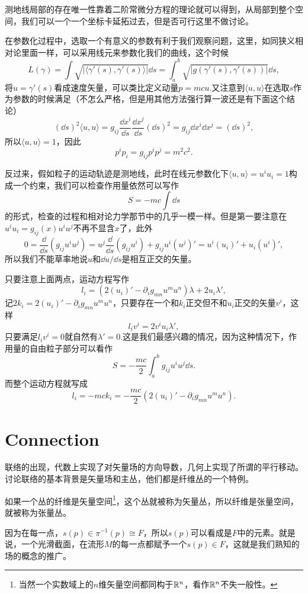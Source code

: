 测地线局部的存在唯一性靠着二阶常微分方程的理论就可以得到，从局部到整个空间，我们可以一个一个坐标卡延拓过去，但是否可行这里不做讨论。

在参数化过程中，选取一个有意义的参数有利于我们观察问题，这里，如同狭义相对论里面一样，可以采用线元来参数化我们的曲线，这个时候
\[
	L(\gamma)=\int \sqrt{|\langle\gamma'(s),\gamma'(s)\rangle|}\dd s=\int_a^b \sqrt{|g(\gamma'(s),\gamma'(s))|}\dd s,
\]
将$u=\gamma'(s)$看成速度矢量，可以类比定义动量$p=mcu$.又注意到$\langle u,u\rangle$在选取$s$作为参数的时候满足（不怎么严格，但是用其他方法强行算一波还是有下面这个结论）
\[
	(\dd s)^2\langle u, u\rangle=g_{ij}\frac{\dd x^i}{\dd s}\frac{\dd x^j}{\dd s}(\dd s)^2=g_{ij}\dd x^i\dd x^j=(\dd s)^2,
\]
所以$\langle u, u\rangle=1$，因此
\[
	p^ip_i=g_{ij}p^i p^j=m^2c^2.
\]

反过来，假如粒子的运动轨迹是测地线，此时在线元参数化下$\langle u,u\rangle=u^iu_i=1$构成一个约束，我们可以检查作用量依然可以写作
\[
	S=-mc \int \dd s
\]
的形式，检查的过程和相对论力学那节中的几乎一模一样。但是第一要注意在$u^i u_i=g_{ij}(x) u^i u^j$不再不显含$x$了，此外
\[
	0=\frac{\dd}{\dd s}\left(g_{ij}u^iu^j\right)=u^j\frac{\dd}{\dd s}\left(g_{ij}u^i\right)+g_{ij}u^i(u^j)'=u^i(u_i)'+u_i(u^i)',
\]
所以我们不能草率地说$u$和$\dd u /\dd s$是相互正交的矢量。

只要注意上面两点，运动方程写作
\[
	l_i=(2(u_i)'-\partial_ig_{mn}u^mu^n)\lambda+2u_i \lambda',
\]
记$2k_i=2(u_i)'-\partial_ig_{mn}u^mu^n$，只要存在一个和$k_i$正交但不和$u_i$正交的矢量$v^i$，这样
\[
	l_iv^i=2v^iu_i \lambda',
\]
只要满足$l_iv^i=0$就自然有$\lambda'=0$.这是我们最感兴趣的情况，因为这种情况下，作用量的自由粒子部分可以看作
\[
	S=-\frac{mc}{2}\int_a^b g_{ij}u^i u^j \dd s.
\]
而整个运动方程就写成
\[
	l_i=-mck_i=-\frac{mc}{2}\left(2(u_i)'-\partial_ig_{mn}u^mu^n\right).
\]

\section{Connection}

联络的出现，代数上实现了对矢量场的方向导数，几何上实现了所谓的平行移动。讨论联络的基本背景是矢量场和主丛，他们都是纤维丛的一个特例。

\para 如果一个丛的纤维是矢量空间\footnote{当然一个实数域上的$n$维矢量空间都同构于$\mathbb{R}^n$，看作$\mathbb{R}^n$不失一般性。}，这个丛就被称为矢量丛，所以纤维是张量空间，就被称为张量丛。

因为在每一点，$s(p)\in \pi^{-1}(p)\cong F$，所以$s(p)$可以看成是$F$中的元素。就是说，一个光滑截面，在流形$M$的每一点都赋予一个$s(p)\in F$，这就是我们熟知的场的概念的推广。

